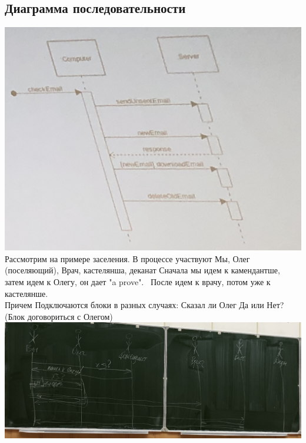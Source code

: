 \documentclass[12pt; a4paper]{book}
\begin{document}
\subsection{Диаграмма последовательности}
\includegraphics[angle=0, width=\textwidth]{IMG/diagr_posl.jpg} \\
Рассмотрим на примере заселения.  В процессе участвуют Мы, Олег (поселяющий), Врач, кастелянша, деканат
Сначала мы идем к камендантше, затем идем к Олегу, он дает "a prove".  После идем к врачу, потом уже  к кастелянше.\\
Причем Подключаются блоки в разных случаях: Сказал ли Олег Да или Нет? (Блок договориться с Олегом)\\
\includegraphics[angle=0, width=\textwidth]{IMG/IMG_0818.jpg} \\
\end{document}
